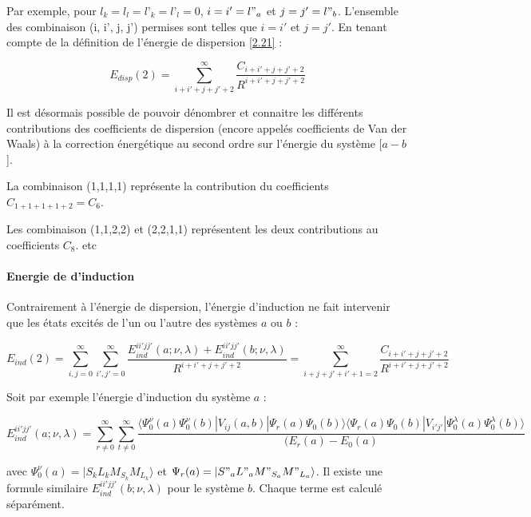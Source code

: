 	Par exemple, pour $l_{k} = l_{l} = l’_{k} = l’_{l} = 0$, $i = i' = l"_{a}$ et $j = j' = l"_{b}$. L'ensemble des combinaison (i, i', j, j') permises sont telles que $i = i'$ et $j = j'$. En tenant compte de la définition de l'énergie de dispersion \ref{2.21} : 
	
	\begin{equation}
	E_{disp}(2) = \sum_{i+i'+j+j'+2}^{\infty} \frac{C_{i+i'+j+j'+2}}{R^{i+i'+j+j'+2}}
	\end{equation}
	
	Il est désormais possible de pouvoir dénombrer et connaitre les différents contributions des coefficients de dispersion (encore appelés coefficients de Van der Waals) à la correction énergétique au second ordre sur l'énergie du système [$a - b$].
	
	La combinaison (1,1,1,1) représente la contribution du coefficients $C_{1+1+1+1+2} = C_{6}$.
	
	Les combinaison (1,1,2,2) et (2,2,1,1) représentent les deux contributions au coefficients $C_{8}$. etc
	
	
	\paragraph{Energie de d’induction}
	
	Contrairement à l'énergie de dispersion, l'énergie d'induction ne fait intervenir que les états excités de l'un ou l'autre des systèmes $a$ ou $b$ : 
	
	\begin{equation}
	E_{ind}(2) = \sum_{i,j=0}^{\infty} \sum_{i',j'=0}^{\infty} \frac{E_{ind}^{ii'jj'} (a; \nu , \lambda) + E_{ind}^{ii'jj'} (b; \nu , \lambda)}{R^{i+i'+j+j'+2}} = \sum_{i+j+j'+i'+1=2}^{\infty} \frac{C_{i+i'+j+j'+2}}{R^{i+i'+j+j'+2}}
	\end{equation}
	
	Soit par exemple l'énergie d'induction du système $a$ :
	
	\begin{equation}
	E_{ind}^{ii'jj'} (a;\nu , \lambda) = \sum_{r \neq 0}^{\infty} \sum_{t\neq 0}^{\infty} \frac{\langle \Psi_{0}^{\nu} (a) \Psi_{0}^{\nu} (b) |V_{ij} (a,b)|\Psi_{r} (a) \Psi_{0} (b) \rangle  \langle \Psi_{r} (a)\Psi_{0} (b) |V_{i'j'}|\Psi_{0}^{\lambda} (a) \Psi_{0}^{\lambda}(b) \rangle}{(E_{r} (a) - E_{0}(a)}
	\end{equation}
	
	avec $\Psi_{0}^{\nu} (a) = |S_{k} L_{k} M_{S_{k}} M_{L_{k}}\rangle$ et $\Psi_{r}(a) = |S"_{a} L"_{a} M"_{S_{a}} M"_{L_{a}}\rangle$. Il existe une formule similaire $E_{ind}^{ii'jj'} (b;\nu , \lambda)$ pour le système $b$. Chaque terme est calculé séparément.\\
	
